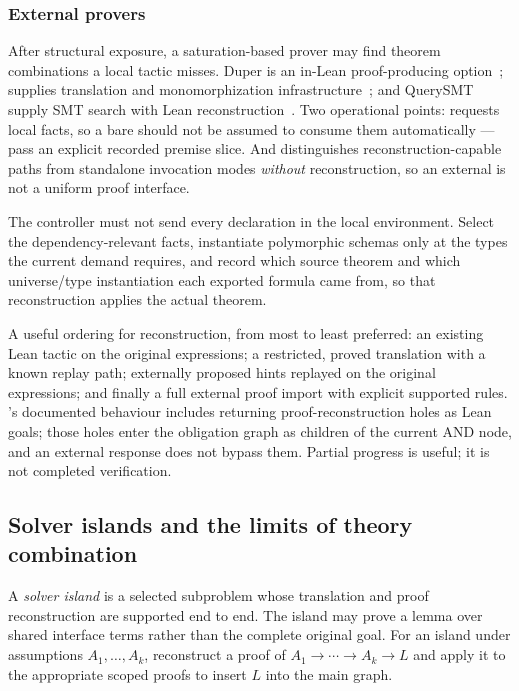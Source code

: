 \subsubsection*{External provers}

After structural exposure, a saturation-based prover may find theorem
combinations a local tactic misses. Duper is an in-Lean proof-producing
option~\cite{duper};  supplies translation and monomorphization
infrastructure~\cite{lean-auto};  and QuerySMT supply SMT search
with Lean reconstruction~\cite{lean-smt,query-smt}. Two operational points:
 requests local facts, so a bare  should not be
assumed to consume them automatically --- pass an explicit recorded premise
slice. And  distinguishes reconstruction-capable paths from
standalone invocation modes \emph{without} reconstruction, so an external
 is not a uniform proof interface.

The controller must not send every declaration in the local environment. Select
the dependency-relevant facts, instantiate polymorphic schemas only at the types
the current demand requires, and record which source theorem and which
universe/type instantiation each exported formula came from, so that
reconstruction applies the actual theorem.

A useful ordering for reconstruction, from most to least preferred: an existing
Lean tactic on the original expressions; a restricted, proved translation with a
known replay path; externally proposed hints replayed on the original
expressions; and finally a full external proof import with explicit supported
rules. 's documented behaviour includes returning
proof-reconstruction holes as Lean goals; those holes enter the obligation graph
as children of the current AND node, and an external  response does
not bypass them. Partial progress is useful; it is not completed verification.

\subsection{Solver islands and the limits of theory combination}

A \emph{solver island} is a selected subproblem whose translation and proof
reconstruction are supported end to end. The island may prove a lemma over
shared interface terms rather than the complete original goal. For an island
under assumptions $A_1,\ldots,A_k$, reconstruct a proof of
$A_1\to\cdots\to A_k\to L$ and apply it to the appropriate scoped proofs to
insert $L$ into the main graph.

